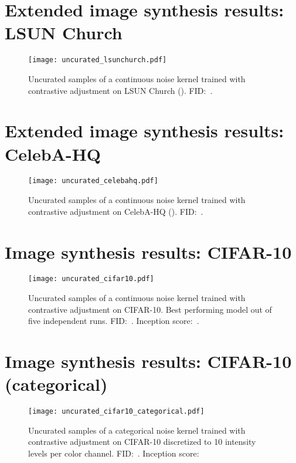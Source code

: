 \documentclass[10pt,twocolumn,letterpaper]{article}
\begin{document}
\newpage
\section{Extended image synthesis results: LSUN Church}\label{app:imagesynthesis:lsunchurch}
\begin{figure}[h!]
  \centering
  \texttt{[image: uncurated\_lsunchurch.pdf]}\caption{
    Uncurated samples of a continuous noise kernel trained with contrastive adjustment on LSUN Church ().
    FID:~.
  }\end{figure}


\newpage
\section{Extended image synthesis results: CelebA-HQ}\label{app:imagesynthesis:celebahq}
\begin{figure}[h!]
  \centering
  \texttt{[image: uncurated\_celebahq.pdf]}\caption{
    Uncurated samples of a continuous noise kernel trained with contrastive adjustment on CelebA-HQ ().
    FID:~.
  }\end{figure}


\newpage
\section{Image synthesis results: CIFAR-10}\label{app:imagesynthesis:cifar10}

\begin{figure}[h!]
  \centering
  \texttt{[image: uncurated\_cifar10.pdf]}\caption{
    Uncurated samples of a continuous noise kernel trained with contrastive adjustment on CIFAR-10.
    Best performing model out of five independent runs.
    FID:~. Inception score:~.
  }\end{figure}


\newpage
\section{Image synthesis results: CIFAR-10 (categorical)}\label{app:imagesynthesis:cifar10:categorical}

\begin{figure}[h!]
  \centering
  \texttt{[image: uncurated\_cifar10\_categorical.pdf]}\caption{
    Uncurated samples of a categorical noise kernel trained with contrastive adjustment on CIFAR-10 discretized to 10 intensity levels per color channel.
    FID:~. Inception score:~
  }\end{figure}
\end{document}
